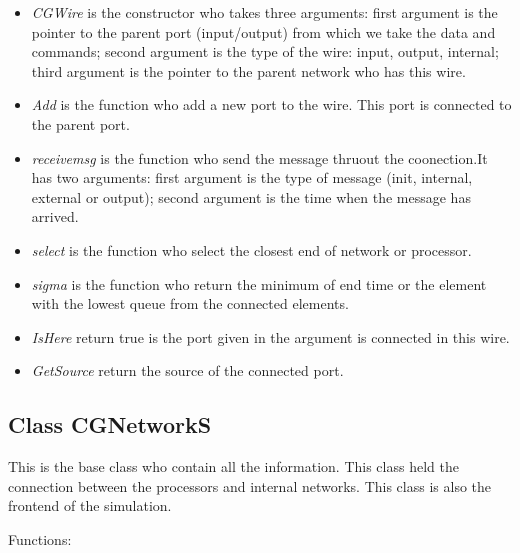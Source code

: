 \documentclass[a4paper,oneside,notitlepage]{article}
\begin{document}
\begin{itemize}
\item \textit{CGWire} is the constructor who takes three arguments: first
argument is the pointer to the parent port (input/output) from which we take
the data and commands; second argument is the type of the wire: input,
output, internal; third argument is the pointer to the parent network who
has this wire.

\item \textit{Add} is the function who add a new port to the wire. This port
is connected to the parent port.

\item \textit{receivemsg} is the function who send the message thruout the
coonection.It has two arguments: first argument is the type of message
(init, internal, external or output); second argument is the time when the
message has arrived.

\item \textit{select} is the function who select the closest end of network
or processor.

\item \textit{sigma} is the function who return the minimum of end time or
the element with the lowest queue from the connected elements.

\item \textit{IsHere} return true is the port given in the argument is
connected in this wire.

\item \textit{GetSource} return the source of the connected port.
\end{itemize}

\subsection{Class CGNetworkS}

This is the base class who contain all the information. This class held the
connection between the processors and internal networks. This class is also
the frontend of the simulation.

Functions:
\end{document}
